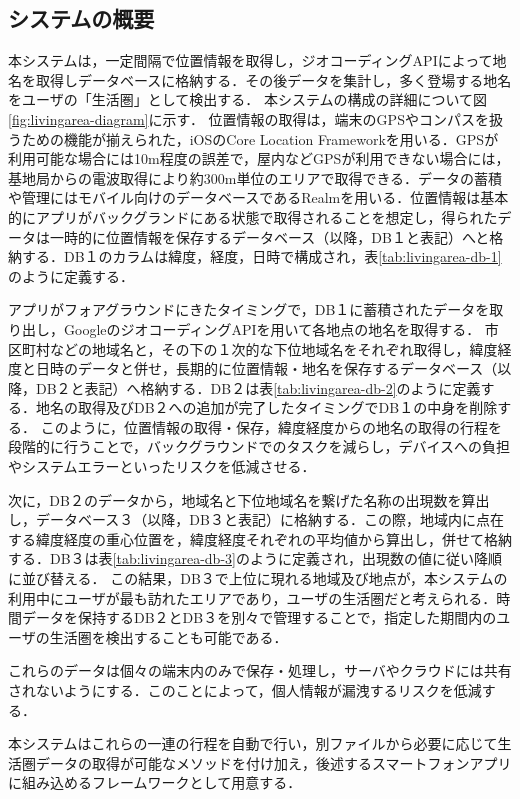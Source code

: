 \documentclass[a4paper]{jsarticle}
\begin{document}
\subsection{システムの概要}
本システムは，一定間隔で位置情報を取得し，ジオコーディングAPIによって地名を取得しデータベースに格納する．その後データを集計し，多く登場する地名をユーザの「生活圏」として検出する．
本システムの構成の詳細について図\ref{fig:livingarea-diagram}に示す．
位置情報の取得は，端末のGPSやコンパスを扱うための機能が揃えられた，iOSのCore Location Frameworkを用いる．GPSが利用可能な場合には10m程度の誤差で，屋内などGPSが利用できない場合には，基地局からの電波取得により約300m単位のエリアで取得できる．データの蓄積や管理にはモバイル向けのデータベースであるRealmを用いる．位置情報は基本的にアプリがバックグランドにある状態で取得されることを想定し，得られたデータは一時的に位置情報を保存するデータベース（以降，DB１と表記）へと格納する．DB１のカラムは緯度，経度，日時で構成され，表\ref{tab:livingarea-db-1}のように定義する．

アプリがフォアグラウンドにきたタイミングで，DB１に蓄積されたデータを取り出し，GoogleのジオコーディングAPIを用いて各地点の地名を取得する．
市区町村などの地域名と，その下の１次的な下位地域名をそれぞれ取得し，緯度経度と日時のデータと併せ，長期的に位置情報・地名を保存するデータベース（以降，DB２と表記）へ格納する．DB２は表\ref{tab:livingarea-db-2}のように定義する．地名の取得及びDB２への追加が完了したタイミングでDB１の中身を削除する．
このように，位置情報の取得・保存，緯度経度からの地名の取得の行程を段階的に行うことで，バックグラウンドでのタスクを減らし，デバイスへの負担やシステムエラーといったリスクを低減させる．

次に，DB２のデータから，地域名と下位地域名を繋げた名称の出現数を算出し，データベース３（以降，DB３と表記）に格納する．この際，地域内に点在する緯度経度の重心位置を，緯度経度それぞれの平均値から算出し，併せて格納する．DB３は表\ref{tab:livingarea-db-3}のように定義され，出現数の値に従い降順に並び替える．
この結果，DB３で上位に現れる地域及び地点が，本システムの利用中にユーザが最も訪れたエリアであり，ユーザの生活圏だと考えられる．時間データを保持するDB２とDB３を別々で管理することで，指定した期間内のユーザの生活圏を検出することも可能である．

これらのデータは個々の端末内のみで保存・処理し，サーバやクラウドには共有されないようにする．このことによって，個人情報が漏洩するリスクを低減する．

本システムはこれらの一連の行程を自動で行い，別ファイルから必要に応じて生活圏データの取得が可能なメソッドを付け加え，後述するスマートフォンアプリに組み込めるフレームワークとして用意する．
\end{document}
